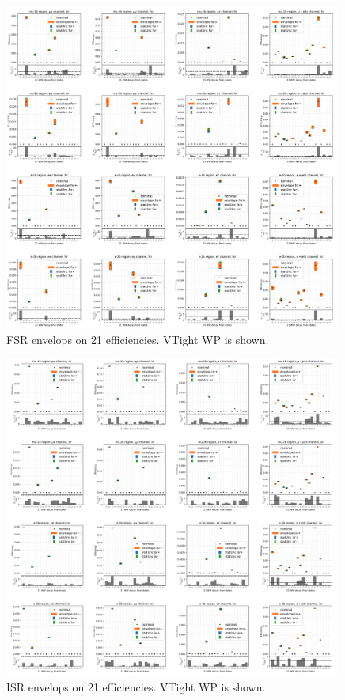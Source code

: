 \begin{figure}
    \centering
    \includegraphics[width=0.99\textwidth]{chapters/Analysis/sectionSystematics/figures/ttTheoretical/fsr.png}    
    \caption{FSR envelops on 21 efficiencies. VTight WP is shown.}
    \label{fig:analysis:systematics:effAfterCorrFSR}
\end{figure}



\begin{figure}
    \centering
    \includegraphics[width=0.99\textwidth]{chapters/Analysis/sectionSystematics/figures/ttTheoretical/isr.png}
    \caption{ISR envelops on 21 efficiencies. VTight WP is shown.}
    \label{fig:analysis:systematics:effAfterCorrISR}
\end{figure}


